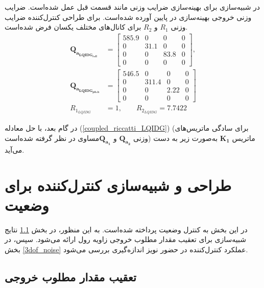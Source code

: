 \documentclass{CCI2020}
\begin{document}
	در شبیه‌سازی برای بهینه‌سازی ضرایب وزنی مانند قسمت قبل عمل شده‌است.
	ضرایب وزنی خروجی بهینه‌سازی در پایین آورده شده‌است. برای طراحی کنترل‌کننده
	ضرایب وزنی
	$R_1$
	و
	$R_2$
	برای کانال‌های مختلف یکسان فرض شده‌است.
	\begin{equation}
		\begin{split}
			\boldsymbol{Q_{a_{LQIDG_{roll}}}} &= \begin{bmatrix}
				585.9 &0& 0& 0\\
				0 &  31.1 & 0 &0 \\
				0 & 0 & 83.8 & 0\\
				0 & 0 & 0 & 0
			\end{bmatrix} ,\\
			\boldsymbol{Q_{a_{LQIDG_{pitch}}}} &= \begin{bmatrix}
				546.5 &0& 0& 0\\
				0 &  311.4 & 0 &0 \\
				0 & 0 & 2.22 & 0\\
				0 & 0 & 0 & 0
			\end{bmatrix}\\
			R_{1_{LQIDG}} &=  1,\qquad  R_{2_{LQIDG}} =  7.7422
		\end{split}
	\end{equation}
	
	در گام بعد، با حل معادله
	(\ref{coupled_riccatti_LQIDG})
	(برای سادگی ماتریس‌های وزنی $\boldsymbol{{Q}_{a_2}}$ و $\boldsymbol{{Q}_{a_1}}$مساوی در نظر گرفته شده‌است)
	ماتریس
	$\boldsymbol{{K}_1}$
	به‌صورت زیر به دست می‌آید.
	
	
	\section{طراحی و شبیه‌سازی کنترل‌کننده برای وضعیت}\label{roll_pitch_yaw_lqidg_section_ll}
	در این بخش به کنترل وضعیت پرداخته شده‌است. به این منظور، در بخش
	\ref{3dof_regulator}
	نتایج شبیه‌سازی برای تعقیب مقدار مطلوب خروجی زاویه رول ارائه می‌شود. سپس، در بخش
	\ref{3dof_noise}
	عملکرد کنترل‌کننده در  حضور نویز اندازه‌گیری بررسی می‌شود.
	\subsection{تعقیب مقدار مطلوب خروجی}\label{3dof_regulator}
	
\end{document}
